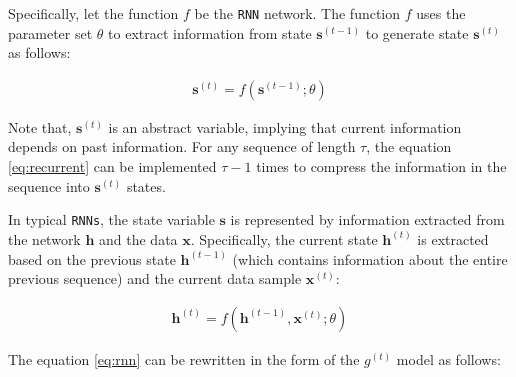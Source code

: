 
Specifically, let the function $f$ be the \verb|RNN| network. The function $f$ uses the parameter set $\theta$ to extract information from state $\mathbf{s}^{(t-1)}$ to generate state $\mathbf{s}^{(t)}$ as follows:

\begin{align}
    \mathbf{s}^{(t)} = f\left( \mathbf{s}^{(t-1)}; \theta \right)
    \label{eq:recurrent}
\end{align}


Note that, $\mathbf{s}^{(t)}$ is an abstract variable, implying that current information depends on past information. For any sequence of length $\tau$, the equation \ref{eq:recurrent} can be implemented $\tau-1$ times to compress the information in the sequence into $\mathbf{s}^{(t)}$ states.


In typical \verb|RNNs|, the state variable $\mathbf{s}$ is represented by information extracted from the network $\mathbf{h}$ and the data $\mathbf{x}$. Specifically, the current state $\mathbf{h}^{(t)}$ is extracted based on the previous state $\mathbf{h}^{(t-1)}$ (which contains information about the entire previous sequence) and the current data sample $\mathbf{x}^{(t)}$:

\begin{align}
    \mathbf{h}^{(t)} = f\left( \mathbf{h}^{(t-1)}, \mathbf{x}^{(t)}; \theta \right)
    \label{eq:rnn}
\end{align}


The equation \ref{eq:rnn} can be rewritten in the form of the $g^{(t)}$ model as follows:

